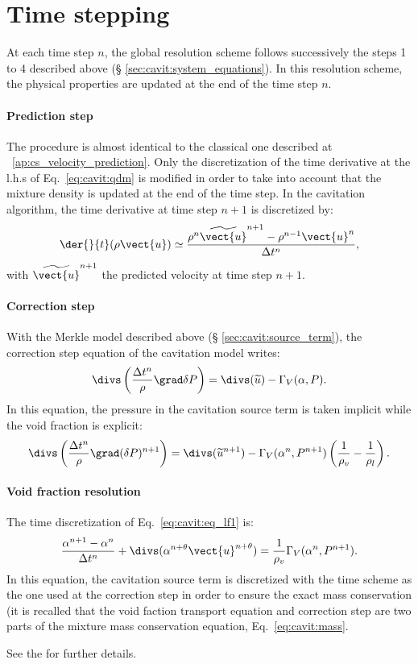 \section{Time stepping}\label{sec:cavit:time_stepping}
At each time step $n$, the global resolution scheme follows successively
the steps 1 to 4 described above (\S
\ref{sec:cavit:system_equations}). In this resolution scheme, the physical
properties are updated at the end of the time step $n$.

\paragraph{Prediction step} The procedure is almost identical to the
classical one described at \appendixname~\ref{ap:cs_velocity_prediction}. Only the
discretization of the time derivative at the l.h.s of
Eq.~\eqref{eq:cavit:qdm} is modified in order to take into account that the
mixture density is updated at the end of the time step. In the
cavitation algorithm, the time derivative at time step $n+1$ is
discretized by:
\begin{equation*}
\der{}{
t}(\rho\vect{u})\simeq \frac{\rho^n\widetilde{\vect{u}}^{n+1}-\rho^{n-1}\vect{u}^n}{\Delta t^n},
\end{equation*}
%
with $\widetilde{\vect{u}}^{n+1}$ the predicted velocity at time step
$n+1$.
%
\paragraph{Correction step}
With the Merkle model described above (\S
\ref{sec:cavit:source_term}), the correction step equation of the
cavitation model writes:
\begin{equation*}
\divs\left(\frac{\Delta t^n}{\rho}\grad\delta P\right) =
\divs(\widetilde{u})-\Gamma_V(\alpha,P).
\end{equation*}
In this equation, the pressure in the cavitation source term is taken
implicit while the void fraction is explicit:
\begin{equation*}
\divs\left(\frac{\Delta t^n}{\rho}\grad(\delta P)^{n+1}\right) =
\divs(\widetilde{u}^{n+1})-\Gamma_V(\alpha^n,P^{n+1})\left(\frac{1}{\rho_v}-\frac{1}{\rho_l}\right).
\end{equation*}
%
\paragraph{Void fraction resolution}
The time discretization of Eq.~\eqref{eq:cavit:eq_lf1} is:
\begin{equation}\label{eq:cavit:eq_vf_dis}
\frac{\alpha^{n+1}-\alpha^n}{\Delta t^n}+\divs(\alpha^{n+\theta}\vect{u}^{n+\theta}) =
\frac{1}{\rho_v}\Gamma_V(\alpha^n,P^{n+1}).
\end{equation}
In this equation, the cavitation source term is discretized with the
time scheme as the one used at the correction step in order to
ensure the exact mass conservation (it is recalled that the void
faction transport equation and correction step are two parts of the
mixture mass conservation equation, Eq.~\eqref{eq:cavit:mass}.

See the 
for further details.

%
